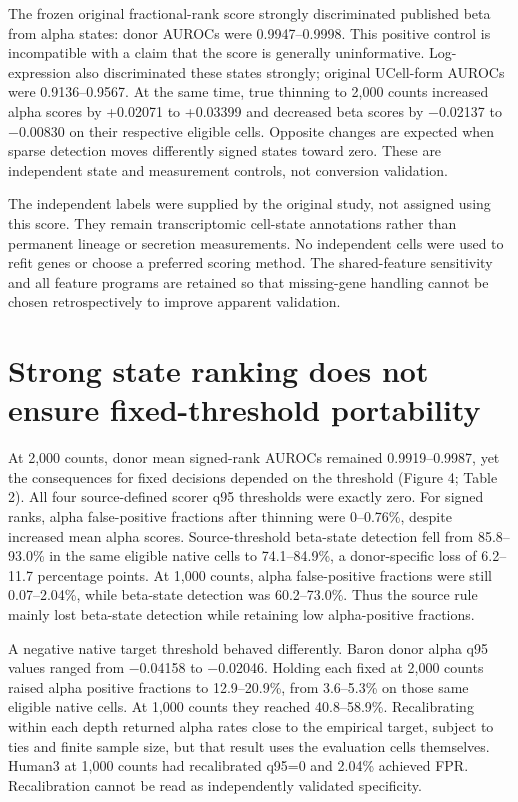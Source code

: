 \documentclass[11pt,letterpaper]{article}
\begin{document}
The frozen original fractional-rank score strongly discriminated published beta from alpha states: donor AUROCs were 0.9947–0.9998. This positive control is incompatible with a claim that the score is generally uninformative. Log-expression also discriminated these states strongly; original UCell-form AUROCs were 0.9136–0.9567. At the same time, true thinning to 2,000 counts increased alpha scores by +0.02071 to +0.03399 and decreased beta scores by −0.02137 to −0.00830 on their respective eligible cells. Opposite changes are expected when sparse detection moves differently signed states toward zero. These are independent state and measurement controls, not conversion validation.

The independent labels were supplied by the original study, not assigned using this score. They remain transcriptomic cell-state annotations rather than permanent lineage or secretion measurements. No independent cells were used to refit genes or choose a preferred scoring method. The shared-feature sensitivity and all feature programs are retained so that missing-gene handling cannot be chosen retrospectively to improve apparent validation.

\section*{Strong state ranking does not ensure fixed-threshold portability}
At 2,000 counts, donor mean signed-rank AUROCs remained 0.9919–0.9987, yet the consequences for fixed decisions depended on the threshold (Figure 4; Table 2). All four source-defined scorer q95 thresholds were exactly zero. For signed ranks, alpha false-positive fractions after thinning were 0–0.76\%, despite increased mean alpha scores. Source-threshold beta-state detection fell from 85.8–93.0\% in the same eligible native cells to 74.1–84.9\%, a donor-specific loss of 6.2–11.7 percentage points. At 1,000 counts, alpha false-positive fractions were still 0.07–2.04\%, while beta-state detection was 60.2–73.0\%. Thus the source rule mainly lost beta-state detection while retaining low alpha-positive fractions.

A negative native target threshold behaved differently. Baron donor alpha q95 values ranged from −0.04158 to −0.02046. Holding each fixed at 2,000 counts raised alpha positive fractions to 12.9–20.9\%, from 3.6–5.3\% on those same eligible native cells. At 1,000 counts they reached 40.8–58.9\%. Recalibrating within each depth returned alpha rates close to the empirical target, subject to ties and finite sample size, but that result uses the evaluation cells themselves. Human3 at 1,000 counts had recalibrated q95=0 and 2.04\% achieved FPR. Recalibration cannot be read as independently validated specificity.
\end{document}
